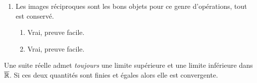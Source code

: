 {\begin{nntd-sol}[]
\begin{enumerate}
\begin{enumerate}
                    \item Schéma explicatif:
                    \begin{center}
                    \end{center}
                    On voit encore une fois clairement que \(f(\comp A)=f(\varnothing)=\varnothing\). Par contre,
                    \(\comp{f(A)}=\comp B = C\ne\varnothing\).
                \end{enumerate}
                \item Les images réciproques sont les bons objets pour ce genre d'opérations, tout est conservé.
                \begin{enumerate}
                    \item Vrai, preuve facile.
                    \item Vrai, preuve facile.
                \end{enumerate}
            \end{enumerate}

        \end{nntd-sol}
    }{}
\begin{nnremark}
    Une suite réelle admet \textit{toujours} une limite supérieure et une limite inférieure dans \(\overline{\mathbb{R}}\). 
    Si ces deux quantités sont finies et égales alors elle est convergente.
\end{nnremark}
